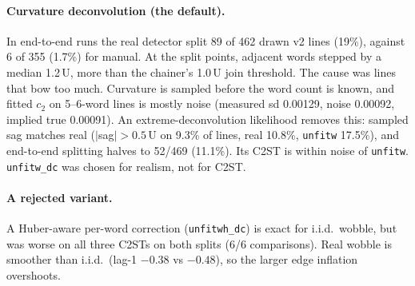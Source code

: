 \documentclass[10.5pt,a4paper]{article}
\newcommand{\U}{\,U}
\begin{document}
\paragraph{Curvature deconvolution (the default).} In end-to-end runs the real detector split 89 of 462 drawn v2 lines (19\%),
against 6 of 355 (1.7\%) for manual. At the split points, adjacent words stepped by a median 1.2\U, more than the chainer's
1.0\U{} join threshold. The cause was lines that bow too much. Curvature is sampled before the word count is known, and
fitted $c_2$ on 5--6-word lines is mostly noise (measured sd 0.00129, noise 0.00092, implied true 0.00091). An
extreme-deconvolution likelihood removes this: sampled sag matches real ($|$sag$|>0.5$\U{} on 9.3\% of lines, real 10.8\%,
\texttt{unfitw} 17.5\%), and end-to-end splitting halves to 52/469 (11.1\%). Its C2ST is within noise of \texttt{unfitw}.
\texttt{unfitw\_dc} was chosen for realism, not for C2ST.

\paragraph{A rejected variant.} A Huber-aware per-word correction (\texttt{unfitwh\_dc}) is exact for i.i.d.\ wobble, but was
worse on all three C2STs on both splits (6/6 comparisons). Real wobble is smoother than i.i.d.\ (lag-1 $-0.38$ vs $-0.48$),
so the larger edge inflation overshoots.
\end{document}

